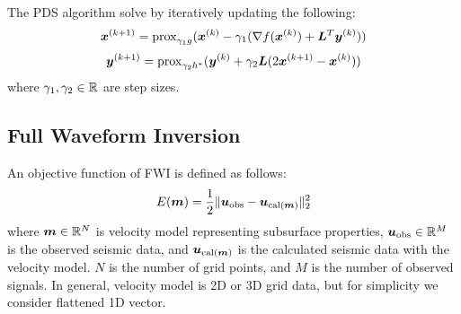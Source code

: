 The PDS algorithm solve by iteratively updating the following:
\begin{equation} \label{eq:PDSSubStepX} \bm{x}^{(k+1)} = \mathrm{prox}_{\gamma_1 g}(\bm{x}^{(k)} - \gamma_1( \nabla f(\bm{x}^{(k)}) + \bm{L}^T \bm{y}^{(k)} )) \end{equation}
\begin{equation} \label{eq:PDSSubStepY} \bm{y}^{(k+1)} = \mathrm{prox}_{\gamma_2 h^*}(\bm{y}^{(k)} + \gamma_2 \bm{L} (2\bm{x}^{(k+1)} - \bm{x}^{(k)}) ) \end{equation}
where $\gamma_1, \gamma_2 \in \mathbb{R}$ are step sizes.

\subsection{Full Waveform Inversion}\label{subsec:full-waveform-inversion}
An objective function of FWI is defined as follows\cite{FWI0}:
\begin{equation} \label{eq:FWIObjective} E(\bm{m}) = \frac {1} {2} \lVert  \bm{u}_{\mathrm{obs}} - \bm{u}_{\mathrm{cal}(\bm{m})}  \rVert _2^2 \end{equation}
where $\bm{m} \in \mathbb{R}^{N}$ is velocity model representing subsurface properties, $\bm{u}_{\mathrm{obs}} \in \mathbb{R}^{M}$ is the observed seismic data, and $\bm{u}_{\mathrm{cal}(\bm{m})}$ is the calculated seismic data with the velocity model.
$N$ is the number of grid points, and $M$ is the number of observed signals.
In general, velocity model is 2D or 3D grid data, but for simplicity we consider flattened 1D vector.
